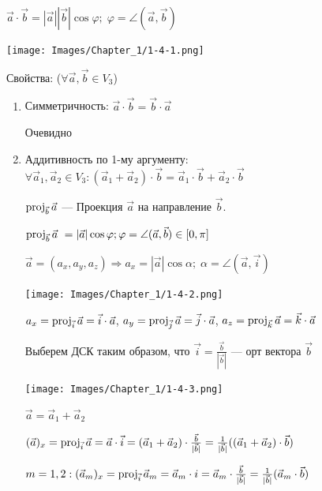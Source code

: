 \(\vec a \cdot \vec b = |\vec a| |\vec b| \cos\varphi;\; \varphi = \angle(\vec a, \vec b)\)
\begin{center}
    \texttt{[image: Images/Chapter\_1/1-4-1.png]}
\end{center}
Свойства: (\(\forall \vec a, \vec b \in V_3\))
\begin{enumerate}
    \item Симметричность: \(\vec a \cdot \vec b = \vec b \cdot \vec a\)

          Очевидно
    \item Аддитивность по 1-му аргументу: \(\forall \vec a_1, \vec a_2 \in V_3:
          (\vec a_1 + \vec a_2) \cdot \vec b = \vec a_1 \cdot \vec b + \vec a_2 \cdot \vec b\)

          \(\operatorname{proj}_{\vec b}\vec a\) --- Проекция \(\vec a\) на направление \(\vec b\).

          \(\operatorname{proj}_{\vec b}\vec a\ = |\vec a| \cos \varphi; \varphi = \angle(\vec a, \vec b) \in [0, \pi]\)

          \(\vec a = (a_x, a_y, a_z) \Rightarrow a_x = |\vec a| \cos\alpha;\; \alpha = \angle(\vec a, \vec i)\)
          \begin{center}
              \texttt{[image: Images/Chapter\_1/1-4-2.png]}
          \end{center}
          \(a_x = \operatorname{proj}_{\vec i}\vec a = \vec i \cdot \vec a\),
          \(a_y = \operatorname{proj}_{\vec j}\vec a = \vec j \cdot \vec a\),
          \(a_z = \operatorname{proj}_{\vec k}\vec a = \vec k \cdot \vec a\)

          Выберем ДСК таким образом, что \(\vec i = \frac{\vec b}{|\vec b|}\) --- орт вектора \(\vec b\)
          \begin{center}
              \texttt{[image: Images/Chapter\_1/1-4-3.png]}
          \end{center}
          \(\vec a = \vec a_1 + \vec a_2\)

          \((\vec a)_x = \operatorname{proj}_{\vec i}\vec a = \vec a \cdot \vec i =
          (\vec a_1 + \vec a_2) \cdot \frac{\vec b}{|\vec b|} =
          \frac{1}{|\vec b|} ((\vec a_1 + \vec a_2) \cdot \vec b)\)

          \(m = 1, 2: (\vec a_m)_x = \operatorname{proj}_{\vec i}\vec a_m = \vec a_m \cdot i =
          \vec a_m \cdot \frac{\vec b}{|\vec b|} =
          \frac{1}{|\vec b|} (\vec a_m \cdot \vec b)\)


\end{enumerate}
